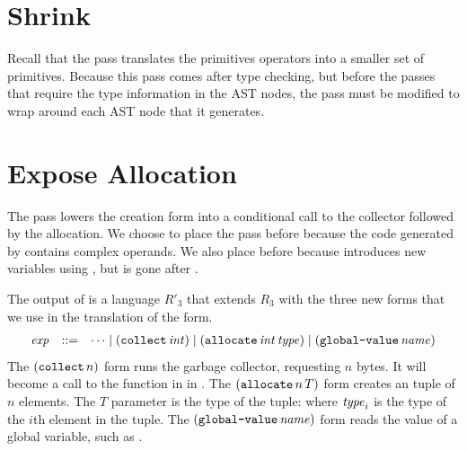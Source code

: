 \documentclass[11pt]{book}
\begin{document}
\section{Shrink}
\label{sec:shrink-R3}

Recall that the  pass translates the primitives operators
into a smaller set of primitives. Because this pass comes after type
checking, but before the passes that require the type information in
the  AST nodes, the  pass must be modified
to wrap  around each AST node that it generates.


\section{Expose Allocation}
\label{sec:expose-allocation}

The pass  lowers the  creation
form into a conditional call to the collector followed by the
allocation.  We choose to place the  pass
before  because the code generated by
 contains complex operands.  We also place
 before  because
 introduces new variables using ,
but  is gone after .

The output of  is a language $R'_3$ that
extends $R_3$ with the three new forms that we use in the translation
of the  form.
\[
\begin{array}{lcl}
  \mathit{exp} &::=& \cdots
      \mid (\texttt{collect} \,\mathit{int})
      \mid (\texttt{allocate} \,\mathit{int}\,\mathit{type})
      \mid (\texttt{global-value} \,\mathit{name})
\end{array}
\]
The $(\texttt{collect}\,n)$ form runs the garbage collector, requesting
$n$ bytes. It will become a call to the  function in
 in .  The
$(\texttt{allocate}\,n\,T)$ form creates an tuple of $n$ elements.
The $T$ parameter is the type of the tuple:  where $\mathit{type}_i$ is the type of the $i$th element in the
tuple. The $(\texttt{global-value}\,\mathit{name})$ form reads the value of
a global variable, such as .
\end{document}
